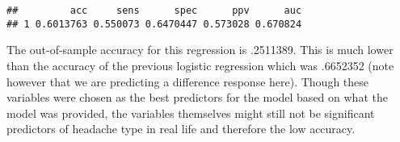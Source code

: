 \documentclass[]{article}
\newenvironment{Shaded}{\begin{snugshade}}{\end{snugshade}}
\newcommand{\ControlFlowTok}[1]{\textcolor[rgb]{0.13,0.29,0.53}{\textbf{#1}}}
\newcommand{\DataTypeTok}[1]{\textcolor[rgb]{0.13,0.29,0.53}{#1}}
\newcommand{\DecValTok}[1]{\textcolor[rgb]{0.00,0.00,0.81}{#1}}
\newcommand{\KeywordTok}[1]{\textcolor[rgb]{0.13,0.29,0.53}{\textbf{#1}}}
\newcommand{\NormalTok}[1]{#1}
\newcommand{\OperatorTok}[1]{\textcolor[rgb]{0.81,0.36,0.00}{\textbf{#1}}}
\newcommand{\OtherTok}[1]{\textcolor[rgb]{0.56,0.35,0.01}{#1}}
\newcommand{\StringTok}[1]{\textcolor[rgb]{0.31,0.60,0.02}{#1}}
\begin{document}
\begin{Shaded}
\end{Shaded}

\begin{verbatim}
##         acc     sens      spec      ppv      auc
## 1 0.6013763 0.550073 0.6470447 0.573028 0.670824
\end{verbatim}

The out-of-sample accuracy for this regression is .2511389. This is much
lower than the accuracy of the previous logistic regression which was
.6652352 (note however that we are predicting a difference response
here). Though these variables were chosen as the best predictors for the
model based on what the model was provided, the variables themselves
might still not be significant predictors of headache type in real life
and therefore the low accuracy.
\end{document}
